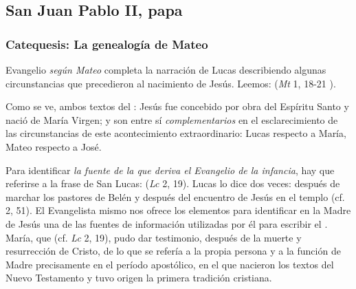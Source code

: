 \subsection{San Juan Pablo II, papa}

\subsubsection{Catequesis: La genealogía de Mateo}


\begin{body}
	 Evangelio \emph{según Mateo} completa la narración de Lucas describiendo algunas circunstancias que precedieron al nacimiento de Jesús. Leemos:  (\emph{Mt} 1, 18-21 ).
	
	Como se ve, ambos textos del : Jesús fue concebido por obra del Espíritu Santo y nació de María Virgen; y son entre sí \emph{complementarios} en el esclarecimiento de las circunstancias de este acontecimiento extraordinario: Lucas respecto a María, Mateo respecto a José.
	
	Para identificar \emph{la fuente de la que deriva el Evangelio de la infancia}, hay que referirse a la frase de San Lucas:  (\emph{Lc} 2, 19). Lucas lo dice dos veces: después de marchar los pastores de Belén y después del encuentro de Jesús en el templo (cf. 2, 51). El Evangelista mismo nos ofrece los elementos para identificar en la Madre de Jesús una de las fuentes de información utilizadas por él para escribir el . María, que  (cf. \emph{Lc} 2, 19), pudo dar testimonio, después de la muerte y resurrección de Cristo, de lo que se refería a la propia persona y a la función de Madre precisamente en el período apostólico, en el que nacieron los textos del Nuevo Testamento y tuvo origen la primera tradición cristiana.
	

\end{body}
